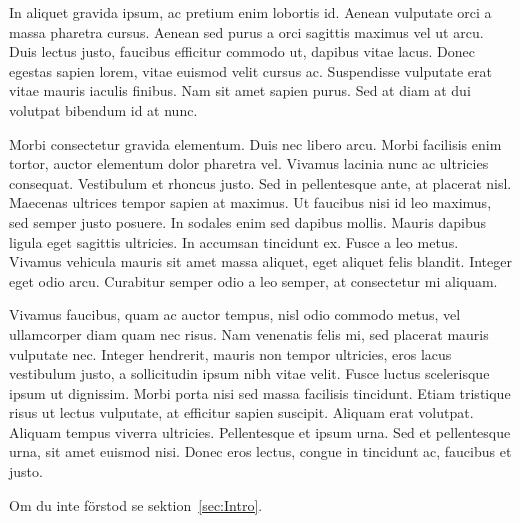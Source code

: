 \documentclass[a4paper,10pt]{article}
\begin{document}
In aliquet gravida ipsum, ac pretium enim lobortis id. Aenean vulputate orci a massa pharetra cursus. Aenean sed purus a orci sagittis maximus vel ut arcu. Duis lectus justo, faucibus efficitur commodo ut, dapibus vitae lacus. Donec egestas sapien lorem, vitae euismod velit cursus ac. Suspendisse vulputate erat vitae mauris iaculis finibus. Nam sit amet sapien purus. Sed at diam at dui volutpat bibendum id at nunc.

Morbi consectetur gravida elementum. Duis nec libero arcu. Morbi facilisis enim tortor, auctor elementum dolor pharetra vel. Vivamus lacinia nunc ac ultricies consequat. Vestibulum et rhoncus justo. Sed in pellentesque ante, at placerat nisl. Maecenas ultrices tempor sapien at maximus. Ut faucibus nisi id leo maximus, sed semper justo posuere. In sodales enim sed dapibus mollis. Mauris dapibus ligula eget sagittis ultricies. In accumsan tincidunt ex. Fusce a leo metus. Vivamus vehicula mauris sit amet massa aliquet, eget aliquet felis blandit. Integer eget odio arcu. Curabitur semper odio a leo semper, at consectetur mi aliquam.

Vivamus faucibus, quam ac auctor tempus, nisl odio commodo metus, vel ullamcorper diam quam nec risus. Nam venenatis felis mi, sed placerat mauris vulputate nec. Integer hendrerit, mauris non tempor ultricies, eros lacus vestibulum justo, a sollicitudin ipsum nibh vitae velit. Fusce luctus scelerisque ipsum ut dignissim. Morbi porta nisi sed massa facilisis tincidunt. Etiam tristique risus ut lectus vulputate, at efficitur sapien suscipit. Aliquam erat volutpat. Aliquam tempus viverra ultricies. Pellentesque et ipsum urna. Sed et pellentesque urna, sit amet euismod nisi. Donec eros lectus, congue in tincidunt ac, faucibus et justo. 

Om du inte förstod se sektion~\ref{sec:Intro}.
\end{document}
